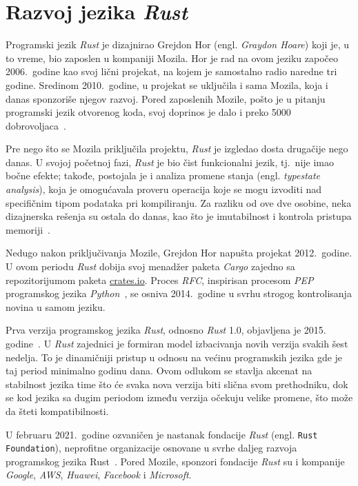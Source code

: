 \documentclass[12pt,oneside]{memoir}
\begin{document}
\section{Razvoj jezika \emph{Rust}}
Programski jezik \emph{Rust} je dizajnirao Grejdon Hor
(engl. \emph{Graydon Hoare}) koji je, u to vreme, bio zaposlen u kompaniji
Mozila.
Hor je rad na ovom jeziku započeo 2006.\ godine kao svoj lični projekat,
na kojem je samostalno radio naredne tri godine.
Sredinom 2010.\ godine, u projekat se
uključila i sama Mozila, koja i danas sponzoriše njegov razvoj.
Pored zaposlenih Mozile, pošto je u pitanju programski jezik otvorenog koda,
svoj doprinos je dalo i preko 5000 dobrovoljaca~\cite{thanks_rust}.

Pre nego što se Mozila priključila projektu, \emph{Rust} je izgledao dosta
drugačije nego danas. U svojoj početnoj fazi, \emph{Rust} je bio čist funkcionalni jezik,
tj.\ nije imao bočne efekte; takođe, postojala je i analiza promene stanja
(engl. \emph{typestate analysis}), koja je omogućavala proveru operacija
koje se mogu izvoditi nad specifičnim tipom podataka pri kompiliranju. Za
razliku od ove dve osobine, neka dizajnerska rešenja su ostala do danas, kao
što je imutabilnost i kontrola pristupa memoriji~\cite{history_rust}.

Nedugo nakon priključivanja Mozile, Grejdon Hor napušta projekat
2012.\ godine. U ovom periodu \emph{Rust} dobija svoj menadžer
paketa \emph{Cargo} zajedno sa repozitorijumom paketa \url{crates.io}.
Proces \emph{RFC}, inspirisan procesom \emph{PEP} programskog jezika
\emph{Python}~\cite{python_pep}, se
osniva 2014.\ godine u svrhu strogog kontrolisanja novina u samom jeziku.

Prva verzija programskog jezika \emph{Rust}, odnosno \emph{Rust} 1.0, objavljena je 2015.
godine~\cite{stable_rust}. U \emph{Rust} zajednici je formiran model izbacivanja novih
verzija svakih šest nedelja. To je dinamičniji pristup
u odnosu na većinu programskih jezika gde je taj period minimalno godinu dana.
Ovom odlukom se stavlja akcenat na stabilnost jezika time što će svaka nova
verzija biti slična svom prethodniku, dok se kod jezika sa dugim periodom
između verzija očekuju velike promene, što može da šteti kompatibilnosti.

U februaru 2021.\ godine ozvaničen je nastanak fondacije \emph{Rust} (engl.
\texttt{Rust Foundation}), neprofitne organizacije osnovane u svrhe daljeg razvoja programskog
jezika Rust~\cite{rust_foundation}. Pored Mozile, sponzori fondacije \emph{Rust} su i kompanije
\emph{Google}, \emph{AWS}, \emph{Huawei}, \emph{Facebook} i \emph{Microsoft}.
\end{document}
